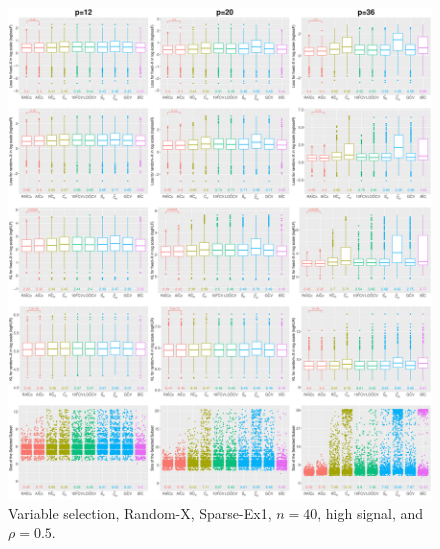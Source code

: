 \begin{figure}[!ht]
\centering
\includegraphics[width=\textwidth]{figures/supplement/randomx/subset_selection/Sparse-Ex1_n40_hsnr_rho05.eps}
\caption{Variable selection, Random-X, Sparse-Ex1, $n=40$, high signal, and $\rho=0.5$.}
\end{figure}
\clearpage
